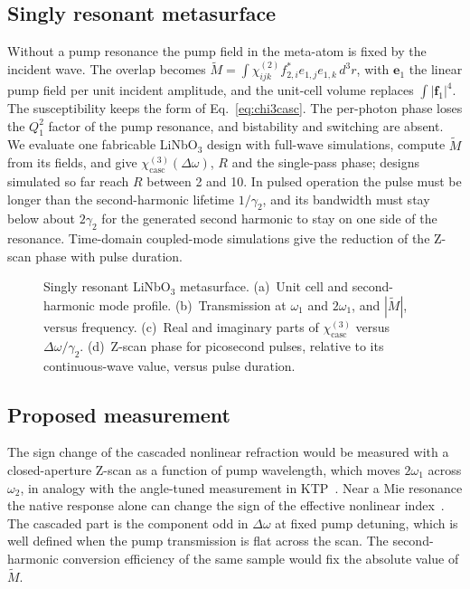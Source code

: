 \documentclass[aps,prapplied,onecolumn,superscriptaddress,longbibliography,nofootinbib]{revtex4-2}
\newcommand{\chitwo}{\chi^{(2)}}
\newcommand{\chicasc}{\chi^{(3)}_{\mathrm{casc}}}
\newcommand{\Dom}{\Delta\omega}
\newcommand{\f}{\mathbf f}
\newcommand{\figbox}[1]{%
  \fbox{\parbox[c][#1][c]{0.92\linewidth}{\centering\small figure in preparation}}}
\begin{document}
\subsection{Singly resonant metasurface}\label{sec:single}

Without a pump resonance the pump field in the meta-atom is fixed by the
incident wave.  The overlap becomes
$\widetilde M=\int\chitwo_{ijk}f^*_{2,i}e_{1,j}e_{1,k}\,d^3r$, with
$\mathbf e_1$ the linear pump field per unit incident amplitude, and the
unit-cell volume replaces $\int|\f_1|^4$.  The susceptibility keeps the
form of Eq.~\eqref{eq:chi3casc}.  The per-photon phase loses the $Q_1^2$
factor of the pump resonance, and bistability and switching are absent.
We evaluate one fabricable LiNbO$_3$ design with full-wave simulations,
compute $\widetilde M$ from its fields, and give $\chicasc(\Dom)$, $R$ and
the single-pass phase; designs simulated so far reach $R$ between 2
and 10.  %
In pulsed operation the pulse must be longer than the second-harmonic
lifetime $1/\gamma_2$, and its bandwidth must stay below about $2\gamma_2$
for the generated second harmonic to stay on one side of the resonance.
Time-domain coupled-mode simulations give the reduction of the Z-scan
phase with pulse duration.

\begin{figure}[t]
  \centering
  \figbox{4cm}
  \caption{Singly resonant LiNbO$_3$ metasurface.
    (a)~Unit cell and second-harmonic mode profile.
    (b)~Transmission at $\omega_1$ and $2\omega_1$, and $|\widetilde M|$,
    versus frequency.
    (c)~Real and imaginary parts of $\chicasc$ versus $\Dom/\gamma_2$.
    (d)~Z-scan phase for picosecond pulses, relative to its
    continuous-wave value, versus pulse duration.}
  \label{fig:single}
\end{figure}

\subsection{Proposed measurement}

The sign change of the cascaded nonlinear refraction would be measured
with a closed-aperture Z-scan as a function of pump wavelength, which
moves $2\omega_1$ across $\omega_2$, in analogy with the angle-tuned
measurement in KTP~\cite{desalvo1992}.  Near a Mie resonance the native
response alone can change the sign of the effective nonlinear
index~\cite{panov2020}.  The cascaded part is the component odd in $\Dom$
at fixed pump detuning, which is well defined when the pump transmission
is flat across the scan.  The second-harmonic conversion efficiency of
the same sample would fix the absolute value of $\widetilde M$.
\end{document}
